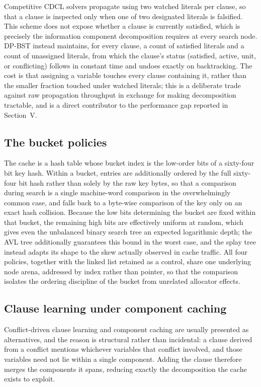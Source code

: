 \documentclass[conference]{IEEEtran}
\begin{document}
Competitive CDCL solvers propagate using two watched literals per clause, so that a clause is
inspected only when one of two designated literals is falsified. This scheme does not expose
whether a clause is currently satisfied, which is precisely the information component
decomposition requires at every search node. DP-BST instead maintains, for every clause, a count
of satisfied literals and a count of unassigned literals, from which the clause's status
(satisfied, active, unit, or conflicting) follows in constant time and undoes exactly on
backtracking. The cost is that assigning a variable touches every clause containing it, rather
than the smaller fraction touched under watched literals; this is a deliberate trade against raw
propagation throughput in exchange for making decomposition tractable, and is a direct contributor
to the performance gap reported in Section~V.

\subsection{The bucket policies}

The cache is a hash table whose bucket index is the low-order bits of a sixty-four bit key hash.
Within a bucket, entries are additionally ordered by the full sixty-four bit hash rather than
solely by the raw key bytes, so that a comparison during search is a single machine-word
comparison in the overwhelmingly common case, and falls back to a byte-wise comparison of the key
only on an exact hash collision. Because the low bits determining the bucket are fixed within
that bucket, the remaining high bits are effectively uniform at random, which gives even the
unbalanced binary search tree an expected logarithmic depth; the AVL tree additionally guarantees
this bound in the worst case, and the splay tree instead adapts its shape to the skew actually
observed in cache traffic. All four policies, together with the linked list retained as a control,
share one underlying node arena, addressed by index rather than pointer, so that the comparison
isolates the ordering discipline of the bucket from unrelated allocator effects.

\subsection{Clause learning under component caching}

Conflict-driven clause learning and component caching are usually presented as alternatives, and
the reason is structural rather than incidental: a clause derived from a conflict mentions
whichever variables that conflict involved, and those variables need not lie within a single
component. Adding the clause therefore merges the components it spans, reducing exactly the
decomposition the cache exists to exploit.
\end{document}
